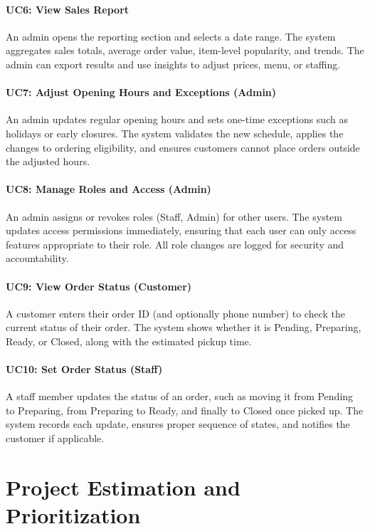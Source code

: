 \documentclass{article}
\begin{document}
\paragraph{UC6: View Sales Report}  
An admin opens the reporting section and selects a date range. The system aggregates sales totals, average order value, item-level popularity, and trends. The admin can export results and use insights to adjust prices, menu, or staffing.

\paragraph{UC7: Adjust Opening Hours and Exceptions (Admin)}  
An admin updates regular opening hours and sets one-time exceptions such as holidays or early closures. The system validates the new schedule, applies the changes to ordering eligibility, and ensures customers cannot place orders outside the adjusted hours.

\paragraph{UC8: Manage Roles and Access (Admin)}  
An admin assigns or revokes roles (Staff, Admin) for other users. The system updates access permissions immediately, ensuring that each user can only access features appropriate to their role. All role changes are logged for security and accountability.

\paragraph{UC9: View Order Status (Customer)}  
A customer enters their order ID (and optionally phone number) to check the current status of their order. The system shows whether it is Pending, Preparing, Ready, or Closed, along with the estimated pickup time.

\paragraph{UC10: Set Order Status (Staff)}  
A staff member updates the status of an order, such as moving it from Pending to Preparing, from Preparing to Ready, and finally to Closed once picked up. The system records each update, ensures proper sequence of states, and notifies the customer if applicable.

\section{Project Estimation and Prioritization}
\end{document}
